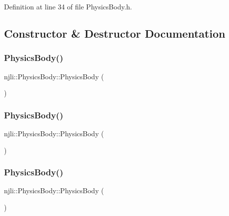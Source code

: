 Definition at line 34 of file Physics\+Body.\+h.



\subsection{Constructor \& Destructor Documentation}
\mbox{\label{classnjli_1_1_physics_body_ad68e3bd30ca09693f5b03855d020923b}} 
\subsubsection{\texorpdfstring{Physics\+Body()}{PhysicsBody()}\hspace{0.1cm}{\footnotesize\ttfamily [1/3]}}
{\footnotesize\ttfamily njli\+::\+Physics\+Body\+::\+Physics\+Body (\begin{DoxyParamCaption}{ }\end{DoxyParamCaption})}

\mbox{\label{classnjli_1_1_physics_body_a58cbc549412fc623f35276d2f18b8785}} 
\subsubsection{\texorpdfstring{Physics\+Body()}{PhysicsBody()}\hspace{0.1cm}{\footnotesize\ttfamily [2/3]}}
{\footnotesize\ttfamily njli\+::\+Physics\+Body\+::\+Physics\+Body (\begin{DoxyParamCaption}\item[{const \mbox{\hyperlink{classnjli_1_1_abstract_builder}{Abstract\+Builder}} \&}]{ }\end{DoxyParamCaption})}

\mbox{\label{classnjli_1_1_physics_body_ae72cb51b910158466d481481e1042a2e}} 
\subsubsection{\texorpdfstring{Physics\+Body()}{PhysicsBody()}\hspace{0.1cm}{\footnotesize\ttfamily [3/3]}}
{\footnotesize\ttfamily njli\+::\+Physics\+Body\+::\+Physics\+Body (\begin{DoxyParamCaption}\item[{const \mbox{\hyperlink{classnjli_1_1_physics_body}{Physics\+Body}} \&}]{ }\end{DoxyParamCaption})}


